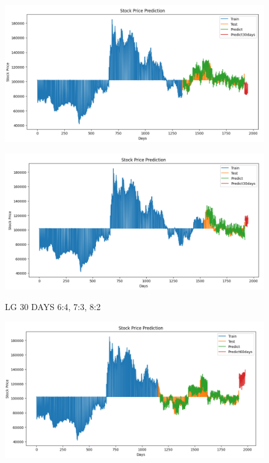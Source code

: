 \documentclass{article}
\begin{document}
\begin{multicols}{2}
\begin{figure}[H]
\begin{minipage}{0.15\textwidth}
    \label{fig:1}
    \end{minipage}%
    \begin{minipage}{0.15\textwidth}
    \centering
    \includegraphics[width=1\textwidth]{Image/N_Beat/N_BEAT_7_3_LG_30DAYS.png}
  
    \label{fig:2}
    \end{minipage}%
    \begin{minipage}{0.15\textwidth}
    \centering
    \includegraphics[width=1\textwidth]{Image/N_Beat/N_BEAT_8_2_LG_30DAYS.png}

    \label{fig:3}
    \end{minipage}
    \caption{LG 30 DAYS  6:4, 7:3, 8:2 }
\end{figure}



\begin{figure}[H]
    \centering
    \begin{minipage}{0.15\textwidth}
    \centering
    \includegraphics[width=1\textwidth]{Image/N_Beat/N_BEAT_6_4_LG_60DAYS.png}
   

\end{minipage}
\end{figure}
\end{multicols}
\end{document}
